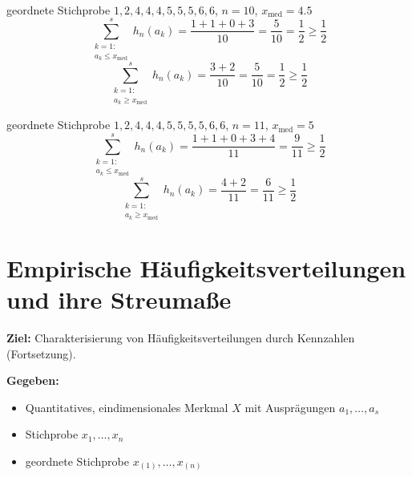 \begin{bsp}[Würfeln]
     \\
    \begin{mytable}
        \begin{minipage}{0.48\textwidth}
            geordnete Stichprobe $1,2,4,4,4,5,5,5,6,6$, $n=10$, $x_{\mathrm{med}}=4.5$
            \[
                \sum_{\substack{k=1:\\ a_k\leq x_{\mathrm{med}}}}^s h_n(a_k) = \frac{1+1+0+3}{10}=\frac{5}{10}=\frac12\geq\frac12
            \]
            \[
                \sum_{\substack{k=1:\\ a_k\geq x_{\mathrm{med}}}}^s h_n(a_k) = \frac{3+2}{10}=\frac{5}{10}=\frac12\geq\frac12
            \]
        \end{minipage}
        \hfill
        \begin{minipage}{0.48\textwidth}
            geordnete Stichprobe $1,2,4,4,4,5,5,5,5,6,6$, $n=11$, $x_{\mathrm{med}}=5$
            \[
                \sum_{\substack{k=1:\\ a_k\leq x_{\mathrm{med}}}}^s h_n(a_k) = \frac{1+1+0+3+4}{11}=\frac{9}{11}\geq\frac12
            \]
            \[
                \sum_{\substack{k=1:\\ a_k\geq x_{\mathrm{med}}}}^s h_n(a_k) = \frac{4+2}{11}=\frac{6}{11}\geq\frac12
            \]
        \end{minipage}
    \end{mytable}
\end{bsp}


\section{Empirische Häufigkeitsverteilungen und ihre \gls{Streumaß}e}\label{sec:empirische-haufigkeitsverteilungen-und-ihre-streumae}

\noindent \textbf{Ziel:} Charakterisierung von Häufigkeitsverteilungen durch Kennzahlen (Fortsetzung).

\noindent \textbf{Gegeben:}
\begin{itemize}
    \item Quantitatives, eindimensionales \gls{Merkmal} $X$ mit Ausprägungen $a_1,\dots,a_s$
    \item Stichprobe $x_1,\dots,x_n$
    \item geordnete Stichprobe $x_{(1)},\dots,x_{(n)}$
\end{itemize}

